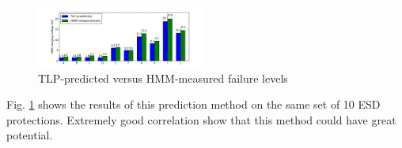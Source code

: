 \begin{figure}[!h]
  \centering
  \includegraphics[width=0.5\textwidth]{src/5/figures/correlation_results.png}
  \caption{TLP-predicted versus HMM-measured failure levels }
  \label{fig:predicted_vs_measured_levels}
\end{figure}

Fig. \ref{fig:predicted_vs_measured_levels} shows the results of this prediction method on the same set of 10 ESD protections.
Extremely good correlation show that this method could have great potential.
